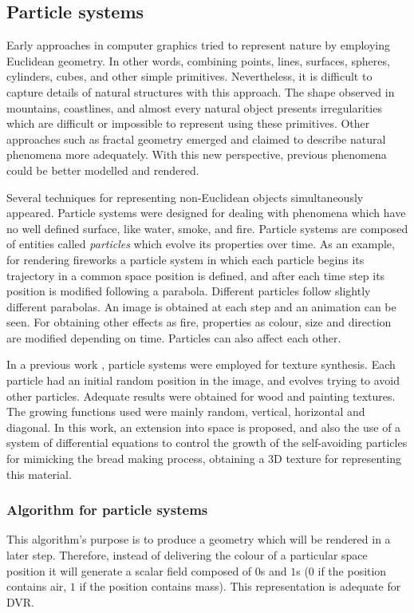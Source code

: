 \documentclass[oneside,a4paper,english,links]{amca}
\begin{document}
\subsection{Particle systems}

Early approaches in computer graphics tried to represent nature by employing Euclidean geometry. In other words, combining points, lines, surfaces, spheres, cylinders, cubes, and other simple primitives. Nevertheless, it is difficult to capture details of natural structures with this approach. The shape observed in mountains, coastlines,  and almost every natural object presents irregularities which are difficult or impossible to represent using these primitives. Other approaches such as fractal geometry \citep{Mandelbrot83} emerged and claimed to describe natural phenomena more adequately. With this new perspective, previous phenomena could be better modelled and rendered. 

Several techniques for representing non-Euclidean
objects simultaneously appeared. Particle systems \citep{Reeves83} were designed for
dealing with phenomena which have no well defined surface, like water,
smoke, and fire. Particle systems are composed of entities called {\em
  particles} which evolve its properties over time. As an example, for
rendering fireworks a particle system in which each
particle begins its trajectory in a common space position is defined, and after
each time step its position is modified following a parabola. Different
particles follow slightly different parabolas. An image is obtained at
each step and an animation can be seen. For obtaining other effects as fire, properties as colour, size and direction are modified
depending on time. Particles can also affect each other.

In a previous work \citep{Baravalle2011}, particle systems were employed for texture synthesis. Each particle had an initial random position in the image, and evolves trying to avoid other particles. Adequate results were obtained for wood and painting textures. The growing functions used were mainly random, vertical, horizontal and diagonal. In this work, an extension into space is proposed, and also the use of a system of differential equations to control the growth of the self-avoiding particles for mimicking the bread making process, obtaining a 3D texture for representing this material. 

\subsubsection{Algorithm for particle systems}
This algorithm's purpose is to produce a geometry which will be rendered in a later step. Therefore, instead of delivering the colour of a particular space position it will generate a scalar field composed of $0$s and $1$s ($0$ if the position contains air, $1$ if the position contains mass). This representation is adequate for DVR.
\end{document}
